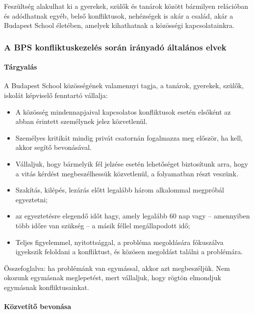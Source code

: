 Feszültség alakulhat ki a gyerekek, szülők és tanárok között bármilyen
relációban és adódhatnak egyéb, belső konfliktusok, nehézségek is akár a
család, akár a Budapest School életében, amelyek kihathatnak a közösségi
kapcsolatainkra.

\subsubsection{A BPS konfliktuskezelés során irányadó általános
elvek}\label{a-bps-konfliktuskezeluxe9s-soruxe1n-iruxe1nyaduxf3-uxe1ltaluxe1nos-elvek}

\paragraph{Tárgyalás}\label{tuxe1rgyaluxe1s}

A Budapest School közösségének valamennyi tagja, a tanárok, gyerekek,
szülők, iskolát képviselő fenntartó vállalja:

\begin{itemize}

\item
  A közösség mindennapjaival kapcsolatos konfliktusok esetén elsőként az
  abban érintett személynek jelez közvetlenül.\\
\item
  Személyes kritikát mindig privát csatornán fogalmazza meg először, ha
  kell, akkor segítő bevonásával.
\item
  Vállaljuk, hogy bármelyik fél jelzése esetén lehetőséget biztosítunk
  arra, hogy a vitás kérdést megbeszélhessük közvetlenül, a folyamatban
  részt veszünk.
\item
  Szakítás, kilépés, lezárás előtt legalább három alkalommal megpróbál
  egyeztetni;
\item
  az egyeztetésre elegendő időt hagy, amely legalább 60 nap vagy --
  amennyiben több időre van szükség -- a másik féllel megállapodott idő;
\item
  Teljes figyelemmel, nyitottsággal, a probléma megoldására fókuszálva
  igyekszik feloldani a konfliktust, és közösen megoldást találni a
  problémára.
\end{itemize}

Összefoglalva: ha problémánk van egymással, akkor azt megbeszéljük. Nem
okozunk egymásnak meglepetést, mert vállaljuk, hogy rögtön elmondjuk
egymásnak konfliktusainkat.

\paragraph{Közvetítő bevonása}\label{kuxf6zvetuxedtux151-bevonuxe1sa}

